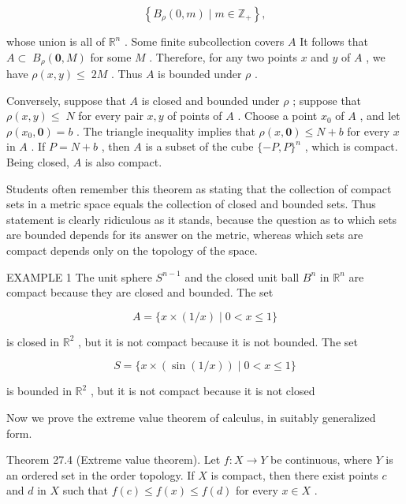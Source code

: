 \documentclass[10pt]{article}
\begin{document}
\[
\left\{  {{B}_{\rho }\left( {0,m}\right)  \mid  m \in  {\mathbb{Z}}_{ + }}\right\}  ,
\]

whose union is all of \({\mathbb{R}}^{n}\) . Some finite subcollection covers \(A\) It follows that \(A \subset \; {B}_{\rho }\left( {\mathbf{0},M}\right)\) for some \(M\) . Therefore, for any two points \(x\) and \(y\) of \(A\) , we have \(\rho \left( {x,y}\right)  \leq \; {2M}\) . Thus \(A\) is bounded under \(\rho\) .

Conversely, suppose that \(A\) is closed and bounded under \(\rho\) ; suppose that \(\rho \left( {x,y}\right)  \leq \; N\) for every pair \(x,y\) of points of \(A\) . Choose a point \({x}_{0}\) of \(A\) , and let \(\rho \left( {{x}_{0},\mathbf{0}}\right)  = b\) . The triangle inequality implies that \(\rho \left( {x,\mathbf{0}}\right)  \leq  N + b\) for every \(x\) in \(A\) . If \(P = N + b\) , then \(A\) is a subset of the cube \(\{  - P,P{\} }^{n}\) , which is compact. Being closed, \(A\) is also compact.

Students often remember this theorem as stating that the collection of compact sets in a metric space equals the collection of closed and bounded sets. Thus statement is clearly ridiculous as it stands, because the question as to which sets are bounded depends for its answer on the metric, whereas which sets are compact depends only on the topology of the space.

EXAMPLE 1 The unit sphere \({S}^{n - 1}\) and the closed unit ball \({B}^{n}\) in \({\mathbb{R}}^{n}\) are compact because they are closed and bounded. The set

\[
A = \{ x \times  \left( {1/x}\right)  \mid  0 < x \leq  1\}
\]

is closed in \({\mathbb{R}}^{2}\) , but it is not compact because it is not bounded. The set

\[
S = \{ x \times  \left( {\sin \left( {1/x}\right) }\right)  \mid  0 < x \leq  1\}
\]

is bounded in \({\mathbb{R}}^{2}\) , but it is not compact because it is not closed

Now we prove the extreme value theorem of calculus, in suitably generalized form.

Theorem 27.4 (Extreme value theorem). Let \(f : X \rightarrow  Y\) be continuous, where \(Y\) is an ordered set in the order topology. If \(X\) is compact, then there exist points \(c\) and \(d\) in \(X\) such that \(f\left( c\right)  \leq  f\left( x\right)  \leq  f\left( d\right)\) for every \(x \in  X\) .
\end{document}
